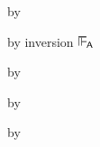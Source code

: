 {\begin{lamportproof*}
    \begin{pfproof}
      \qedstep
        \begin{pfproof}
          by \pfih
        \end{pfproof}
    \end{pfproof}

    \begin{pfproof}
        \begin{pfproof}
          by inversion $\sWLA$
        \end{pfproof}
      \qedstep
        \begin{pfproof}
          by \pfih
        \end{pfproof}
    \end{pfproof}

    \begin{pfproof}
      \qedstep
        \begin{pfproof}
          by \pfih
        \end{pfproof}
    \end{pfproof}

    \begin{pfproof}
      \qedstep
        \begin{pfproof}
          by \pfih
        \end{pfproof}
    \end{pfproof}

\end{lamportproof*}}

